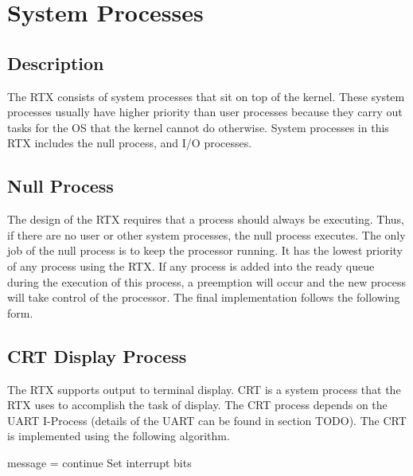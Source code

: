 \documentclass[12pt,twocolumn]{report}
\begin{document}
\section{System Processes}
\subsection{Description}
The RTX consists of system processes that sit on top of the kernel. These system processes usually have higher priority than user processes because they carry out tasks for the OS that the kernel cannot do otherwise. System processes in this RTX includes the null process, and I/O processes.

\subsection{Null Process}
The design of the RTX requires that a process should always be executing. Thus, if there are no user or other system processes, the null process executes. The only job of the null process is to keep the processor running. It has the lowest priority of any process using the RTX. If any process is added into the ready queue during the execution of this process, a preemption will occur and the new process will take control of the processor. The final implementation follows the following form.

 \begin{algorithmic}
    \EndWhile
  \EndFunction
 \end{algorithmic}

\subsection{CRT Display Process}
\label{sec:crt_process}
The RTX supports output to terminal display. CRT is a system process that the RTX uses to accomplish the task of display. The CRT process depends on the UART I-Process (details of the UART can be found in section TODO). The CRT is implemented using the following algorithm.

\begin{algorithmic}
        \State message = 
            \State continue
        \EndIf
        \State {}
        \State Set interrupt bits
    \EndWhile
  \EndFunction
 \end{algorithmic}
\end{document}

